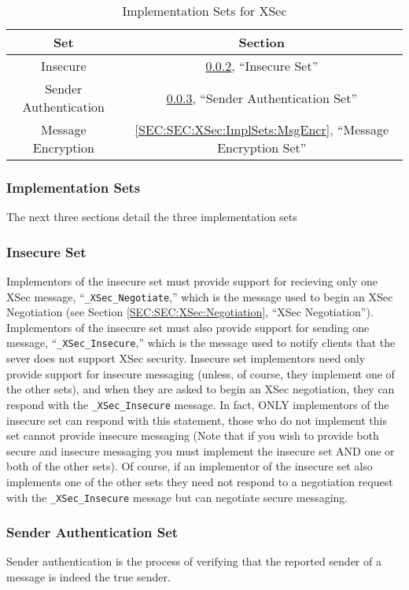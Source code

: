 \documentclass[a4paper,12pt]{article}
\newenvironment{tblcont}[2]{\begin{center}\begin{tabular}{#1}\hline #2\\
	\hline}{\hline\end{tabular}\end{center}}
\begin{document}
\begin{table}
\begin{tblcont}{| c | c |}{\textbf{Set} & \textbf{Section}}
Insecure & \ref{SEC:SEC:XSec:ImplSets:Insec}, ``Insecure Set''\\
Sender Authentication & \ref{SEC:SEC:XSec:ImplSets:SndAuth}, ``Sender Authentication Set''\\
Message Encryption & \ref{SEC:SEC:XSec:ImplSets:MsgEncr}, ``Message Encryption Set''\\
\end{tblcont}
\caption{\label{TAB:XSec:ImplSets} Implementation Sets for XSec}
\end{table}

\subsubsection{Implementation Sets}
\label{SEC:SEC:XSec:ImplSets}
The next three sections detail the three implementation sets

\subsubsection{Insecure Set}
\label{SEC:SEC:XSec:ImplSets:Insec}
Implementors of the insecure set must provide support for recieving only one XSec message, ``\lstinline!_XSec_Negotiate!,'' which is the message used to begin an XSec Negotiation (see Section \ref{SEC:SEC:XSec:Negotiation}, ``XSec Negotiation''). Implementors of the insecure set must also provide support for sending one message, ``\lstinline!_XSec_Insecure!,'' which is the message used to notify clients that the sever does not support XSec security. Insecure set implementors need only provide support for insecure messaging (unless, of course, they implement one of the other sets), and when they are asked to begin an XSec negotiation, they can respond with the \lstinline!_XSec_Insecure! message. In fact, ONLY implementors of the insecure set can respond with this statement, those who do not implement this set cannot provide insecure messaging (Note that if you wish to provide both secure and insecure messaging you must implement the insecure set AND one or both of the other sets). Of course, if an implementor of the insecure set also implements one of the other sets they need not respond to a negotiation request with the \lstinline!_XSec_Insecure! message but can negotiate secure messaging.

\subsubsection{Sender Authentication Set}
\label{SEC:SEC:XSec:ImplSets:SndAuth}
Sender authentication is the process of verifying that the reported sender of a message is indeed the true sender. 
\end{document}
